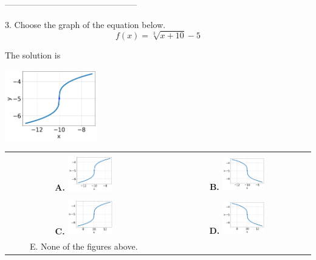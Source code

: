 \documentclass{extbook}[14pt]
\begin{document}
-----------------------------------------------

3. Choose the graph of the equation below.
\[ f(x) = \sqrt[3]{x + 10} - 5 \] 

 
 The solution is  
 \begin{center} \includegraphics[width=0.3\textwidth]{../Figures/radicalEquationToGraphDA.png} \end{center}\begin{tabular}{|c|c|} 
\hline 
 & \tabularnewline 
 \textbf{A.} \includegraphics[width=0.3\textwidth]{../Figures/radicalEquationToGraphDA.png} & \textbf{B.} \includegraphics[width=0.3\textwidth]{../Figures/radicalEquationToGraphBA.png} \tabularnewline 
\hline 
 & \tabularnewline 
 \textbf{C.} \includegraphics[width=0.3\textwidth]{../Figures/radicalEquationToGraphAA.png} & \textbf{D.} \includegraphics[width=0.3\textwidth]{../Figures/radicalEquationToGraphCA.png} \tabularnewline 
\hline 
 E. None of the figures above. & \tabularnewline 
\hline 
 \end{tabular} 
 
\end{document}
